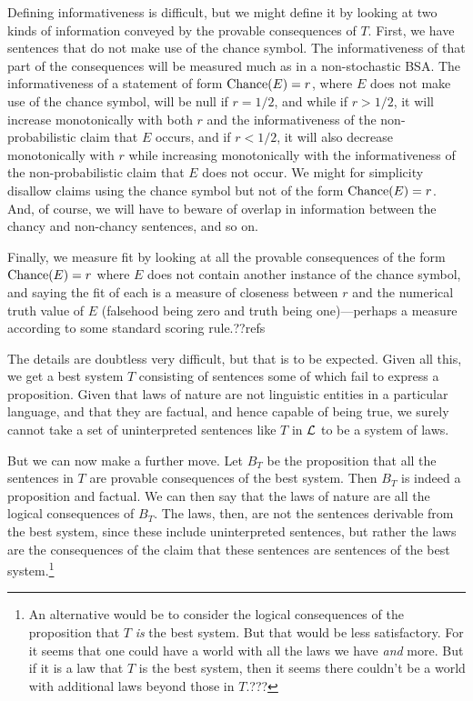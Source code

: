 Defining informativeness is difficult, but we might define it by looking at two kinds of information conveyed by the 
provable consequences of $T$. First, we have sentences that do not make use of the chance symbol. The informativeness
of that part of the consequences will be measured much as in a non-stochastic BSA. The informativeness of a statement
of form $\operatorname{Chance}(E)=r$, where $E$ does not make use of the chance symbol, will be null if $r=1/2$, and while if $r>1/2$, it will increase monotonically with both $r$ 
and the informativeness of the non-probabilistic claim that $E$ occurs, and if $r<1/2$, it will also decrease monotonically with $r$ while increasing monotonically with the informativeness of the non-probabilistic claim that $E$ does not occur. We might for
simplicity disallow claims using the chance symbol but not of the form $\operatorname{Chance}(E)=r$. And, of course, we
will have to beware of overlap in information between the chancy and non-chancy sentences, and so on. 

Finally, we measure fit by looking at all the provable consequences of the form $\operatorname{Chance}(E)=r$ where $E$ does not contain another
instance of the chance symbol, and saying the fit of each is a measure of closeness between $r$ and the numerical truth value of $E$ (falsehood
being zero and truth being one)---perhaps a measure according to some standard scoring rule.??refs

The details are doubtless very difficult, but that is to be expected.
Given all this, we get a best system $T$ consisting of sentences some of which fail to express a proposition. Given that laws of nature
are not linguistic entities in a particular language, and that they are factual, and hence capable of being true, 
we surely cannot take  a set of uninterpreted sentences like $T$ in $\mathcal L$ to be a system of laws. 

But we can now make a further move.
Let $B_T$ be the proposition that all the sentences in $T$ are provable consequences of the best system. Then $B_T$ is indeed a proposition
and factual. We can then say that the laws of nature are all the logical consequences of $B_T$. The laws, then, are not the sentences derivable from the best system, 
since these include uninterpreted sentences, but rather the laws are the consequences of the claim that these sentences are sentences of the 
best system.\footnote{An alternative would be
to consider the logical consequences of the proposition that $T$ \textit{is} the best system. But that would be less satisfactory. For it
seems that one could have a world with all the laws we have \textit{and} more. But if it is a law that $T$ is the best system, then it seems
there couldn't be a world with additional laws beyond those in $T$.???}


